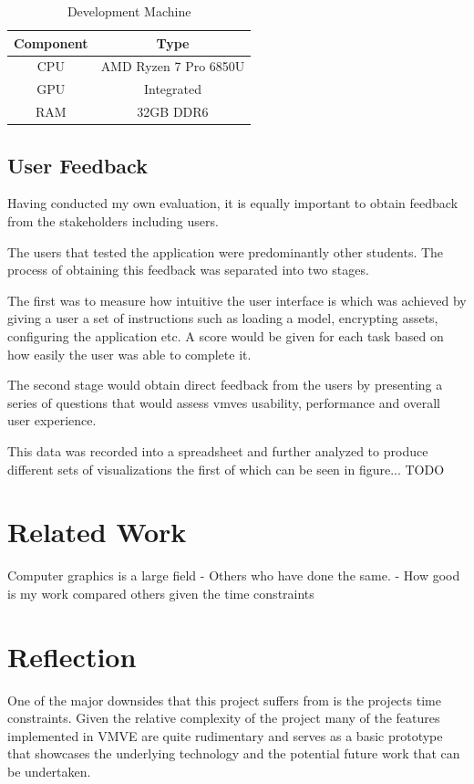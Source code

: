 \documentclass[11pt]{article}
\begin{document}
\begin{table}[h!]
\centering
\begin{tabular}{|| c c ||} 
  \hline
  Component & Type \\ [0.5ex] 
  \hline\hline
  CPU & AMD Ryzen 7 Pro 6850U  \\ 
  GPU & Integrated \\
  RAM & 32GB DDR6 \\ [1ex] 
  \hline
\end{tabular}
\caption{Development Machine}
\label{fig:development_machine}
\end{table}

\subsection{User Feedback}
Having conducted my own evaluation, it is equally important to obtain feedback
from the stakeholders including users.

The users that tested the application were predominantly other students. The
process of obtaining this feedback was separated into two stages.

The first was to measure how intuitive the user interface is which was achieved
by giving a user a set of instructions such as loading a model, encrypting
assets, configuring the application etc. A score would be given for each task
based on how easily the user was able to complete it.

The second stage would obtain direct feedback from the users by presenting a
series of questions that would assess \glspl{vmve} usability, performance and
overall user experience.

This data was recorded into a spreadsheet and further analyzed to produce different
sets of visualizations the first of which can be seen in figure... TODO


\section{Related Work}
Computer graphics is a large field 
- Others who have done the same.
- How good is my work compared others given the time constraints

\section{Reflection}

One of the major downsides that this project suffers from is the projects time
constraints. Given the relative complexity of the project many of the features
implemented in VMVE are quite rudimentary and serves as a basic prototype that
showcases the underlying technology and the potential future work that can be
undertaken.
\end{document}
